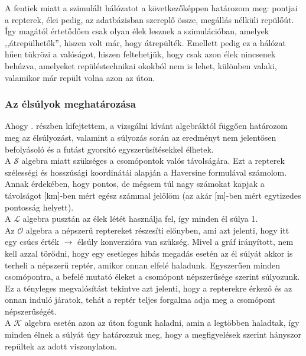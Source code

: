     A fentiek miatt a szimulált hálózatot a következőképpen határozom meg: pontjai a repterek, élei pedig, az adatbázisban szereplő össze, megállás nélküli repülőút. Így magától értetődően csak olyan élek lesznek a szimulációban, amelyek ,,átrepülhetők'', hiszen volt már, hogy átrepülték. Emellett pedig ez a hálózat hűen tükrözi a valóságot, hiszen feltehetjük, hogy csak azon élek nincsenek behúzva, amelyeket repüléstechnikai okokból nem is lehet, különben valaki, valamikor már repült volna azon az úton.

      \subsubsection{Az élsúlyok meghatározása}
      Ahogy . részben kifejtettem, a vizsgálni kívánt algebráktól függően határozom meg az élsúlyozást, valamint a súlyozás során az eredményt nem jelentősen befolyásoló és a futást gyorsító egyszerűsítésekkel élhetek.\\

      A $\mathcal{S}$ algebra miatt szükséges a csomópontok valós távolságára. Ezt a repterek szélességi és hosszúsági koordinátái alapján a Haversine formulával számolom. Annak érdekében, hogy pontos, de mégsem túl nagy számokat kapjak a távolságot [km]-ben mért egész számmal jelölöm (az akár [m]-ben mért egytizedes pontosság helyett).\\
      A $\mathcal{L}$ algebra pusztán az élek létét használja fel, így minden él súlya 1.\\
      Az $\mathcal{O}$ algebra a népszerű reptereket részesíti előnyben, ami azt jelenti, hogy itt egy csúcs érték $\rightarrow$ élsúly konverzióra van szükség. Mivel a gráf irányított, nem kell azzal törődni, hogy egy esetleges hibás megadás esetén az él súlyát akkor is terheli a népszerű reptér, amikor onnan elfelé haladunk. Egyszerűen minden csomópontra, a befelé mutató éleket a csomópont népszerűsége szerint súlyozunk. Ez a tényleges megvalósítást tekintve azt jelenti, hogy a repterekre érkező és az onnan induló járatok, tehát a reptér teljes forgalma adja meg a csomópont népszerűségét.\\
      A $\mathcal{K}$ algebra esetén azon az úton fogunk haladni, amin a legtöbben haladtak, így minden élnek a súlyát úgy határozzuk meg, hogy a megfigyelések szerint hányszor repültek az adott viszonylaton.

